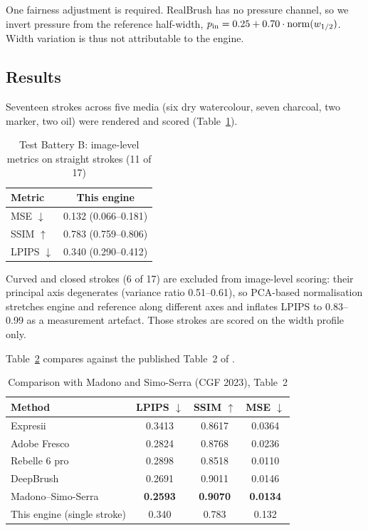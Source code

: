 \documentclass[conference]{IEEEtran}
\begin{document}
One fairness adjustment is required. RealBrush has no pressure channel, so we
invert pressure from the reference half-width,
$p_{\rm in}=0.25+0.70\cdot\mathrm{norm}(w_{1/2})$. Width variation is thus not
attributable to the engine.

\subsection{Results}

Seventeen strokes across five media (six dry watercolour, seven charcoal, two
marker, two oil) were rendered and scored
(Table~\ref{tab:batteryB}).

\begin{table}[t]
\caption{Test Battery B: image-level metrics on straight strokes (11 of 17)}
\label{tab:batteryB}
\centering
\small
\begin{tabular}{lc}
\toprule
Metric & This engine \\
\midrule
MSE $\downarrow$   & 0.132 (0.066--0.181) \\
SSIM $\uparrow$    & 0.783 (0.759--0.806) \\
LPIPS $\downarrow$ & 0.340 (0.290--0.412) \\
\bottomrule
\end{tabular}
\end{table}

Curved and closed strokes (6 of 17) are excluded from image-level scoring:
their principal axis degenerates (variance ratio 0.51--0.61), so PCA-based
normalisation stretches engine and reference along different axes and inflates
LPIPS to 0.83--0.99 as a measurement artefact. Those strokes are scored on the
width profile only.

Table~\ref{tab:compare2} compares against the published Table~2 of
\cite{madono2023}.

\begin{table}[t]
\caption{Comparison with Madono and Simo-Serra (CGF 2023), Table~2}
\label{tab:compare2}
\centering
\small
\begin{tabular}{lccc}
\toprule
Method & LPIPS $\downarrow$ & SSIM $\uparrow$ & MSE $\downarrow$ \\
\midrule
Expresii            & 0.3413 & 0.8617 & 0.0364 \\
Adobe Fresco        & 0.2824 & 0.8768 & 0.0236 \\
Rebelle 6 pro       & 0.2898 & 0.8518 & 0.0110 \\
DeepBrush           & 0.2691 & 0.9011 & 0.0146 \\
Madono--Simo-Serra  & \textbf{0.2593} & \textbf{0.9070} & \textbf{0.0134} \\
\midrule
This engine (single stroke) & 0.340 & 0.783 & 0.132 \\
\bottomrule
\end{tabular}
\end{table}
\end{document}
